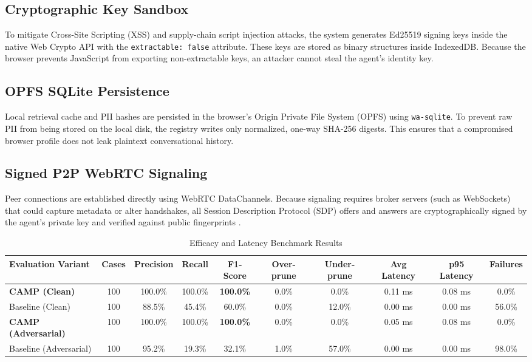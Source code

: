 \documentclass[conference]{IEEEtran}
\begin{document}
\subsection{Cryptographic Key Sandbox}
To mitigate Cross-Site Scripting (XSS) and supply-chain script injection attacks, the system generates Ed25519 signing keys inside the native Web Crypto API with the \texttt{extractable: false} attribute. These keys are stored as binary structures inside IndexedDB. Because the browser prevents JavaScript from exporting non-extractable keys, an attacker cannot steal the agent's identity key.

\subsection{OPFS SQLite Persistence}
Local retrieval cache and PII hashes are persisted in the browser's Origin Private File System (OPFS) using \texttt{wa-sqlite}. To prevent raw PII from being stored on the local disk, the registry writes only normalized, one-way SHA-256 digests. This ensures that a compromised browser profile does not leak plaintext conversational history.

\subsection{Signed P2P WebRTC Signaling}
Peer connections are established directly using WebRTC DataChannels. Because signaling requires broker servers (such as WebSockets) that could capture metadata or alter handshakes, all Session Description Protocol (SDP) offers and answers are cryptographically signed by the agent's private key and verified against public fingerprints \cite{webrtcsec}.

\begin{table}[htbp]
\caption{Efficacy and Latency Benchmark Results}
\label{tab:results}
\centering
\begin{tabular}{lccccccccc}
\toprule
\textbf{Evaluation Variant} & \textbf{Cases} & \textbf{Precision} & \textbf{Recall} & \textbf{F1-Score} & \textbf{Over-prune} & \textbf{Under-prune} & \textbf{Avg Latency} & \textbf{p95 Latency} & \textbf{Failures} \\
\midrule
\textbf{CAMP (Clean)} & 100 & 100.0\% & 100.0\% & \textbf{100.0\%} & 0.0\% & 0.0\% & 0.11 ms & 0.08 ms & 0.0\% \\
Baseline (Clean) & 100 & 88.5\% & 45.4\% & 60.0\% & 0.0\% & 12.0\% & 0.00 ms & 0.00 ms & 56.0\% \\
\textbf{CAMP (Adversarial)} & 100 & 100.0\% & 100.0\% & \textbf{100.0\%} & 0.0\% & 0.0\% & 0.05 ms & 0.08 ms & 0.0\% \\
Baseline (Adversarial) & 100 & 95.2\% & 19.3\% & 32.1\% & 1.0\% & 57.0\% & 0.00 ms & 0.00 ms & 98.0\% \\
\bottomrule
\end{tabular}
\end{table}
\end{document}
